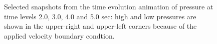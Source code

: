 \documentclass[12pt]{article}
\numberwithin{figure}{section}  %
\numberwithin{equation}{section}  %
\begin{document}
\begin{multicols}{2}
\begin{figure}[!htb]
	\centering
	\caption{Selected snapshots from the time evolution animation of pressure at time levels 2.0, 3.0, 4.0 and 5.0 sec: high and low pressures are shown in the upper-right and upper-left corners because of the applied velocity boundary condtion.}
	\label{fig:defaultpressure}
\end{figure}


\end{multicols}
\end{document}
